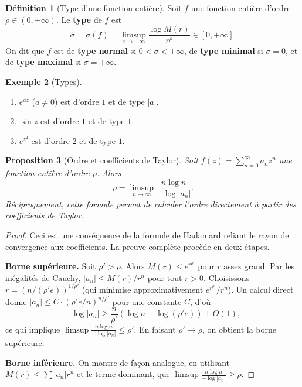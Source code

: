 \documentclass[12pt,a4paper,openany]{book}
\theoremstyle{definition}
\newtheorem{definition}{Définition}[chapter]
\newtheorem{exemple}[definition]{Exemple}
\theoremstyle{plain}
\newtheorem{proposition}[definition]{Proposition}
\theoremstyle{remark}
\newcommand{\abs}[1]{\left|#1\right|}
\begin{document}
\begin{definition}[Type d'une fonction entière]\label{def:type-entiere}
Soit $f$ une fonction entière d'ordre $\rho \in (0, +\infty)$. Le \textbf{type}
de $f$ est
\[
  \sigma = \sigma(f) = \limsup_{r \to +\infty} \frac{\log M(r)}{r^\rho}
  \in [0, +\infty].
\]
On dit que $f$ est de \textbf{type normal} si $0 < \sigma < +\infty$, de
\textbf{type minimal} si $\sigma = 0$, et de \textbf{type maximal} si
$\sigma = +\infty$.
\end{definition}

\begin{exemple}[Types]\label{ex:types}
\begin{enumerate}[label=(\roman*)]
  \item $e^{az}$ ($a \neq 0$) est d'ordre $1$ et de type $\abs{a}$.
  \item $\sin z$ est d'ordre $1$ et de type $1$.
  \item $e^{z^2}$ est d'ordre $2$ et de type $1$.
\end{enumerate}
\end{exemple}

\begin{proposition}[Ordre et coefficients de Taylor]\label{prop:ordre-coefficients}
Soit $f(z) = \sum_{n=0}^{\infty} a_n z^n$ une fonction entière d'ordre $\rho$.
Alors
\[
  \rho = \limsup_{n \to \infty} \frac{n \log n}{-\log \abs{a_n}}.
\]
Réciproquement, cette formule permet de calculer l'ordre directement à partir
des coefficients de Taylor.
\end{proposition}

\begin{proof}
Ceci est une conséquence de la formule de Hadamard reliant le rayon de
convergence aux coefficients. La preuve complète procède en deux étapes.

\textbf{Borne supérieure.} Soit $\rho' > \rho$. Alors $M(r) \leq e^{r^{\rho'}}$
pour $r$ assez grand. Par les inégalités de Cauchy, $\abs{a_n} \leq M(r)/r^n$
pour tout $r > 0$. Choisissons $r = (n/(\rho' e))^{1/\rho'}$ (qui minimise
approximativement $e^{r^{\rho'}}/r^n$). Un calcul direct donne
$\abs{a_n} \leq C \cdot (\rho' e / n)^{n/\rho'}$ pour une constante $C$, d'où
\[
  -\log\abs{a_n} \geq \frac{n}{\rho'}\left(\log n - \log(\rho' e)\right) + O(1),
\]
ce qui implique $\limsup \frac{n\log n}{-\log\abs{a_n}} \leq \rho'$. En faisant
$\rho' \to \rho$, on obtient la borne supérieure.

\textbf{Borne inférieure.} On montre de façon analogue, en utilisant
$M(r) \leq \sum \abs{a_n} r^n$ et le terme dominant, que
$\limsup \frac{n\log n}{-\log\abs{a_n}} \geq \rho$.
\end{proof}
\end{document}
